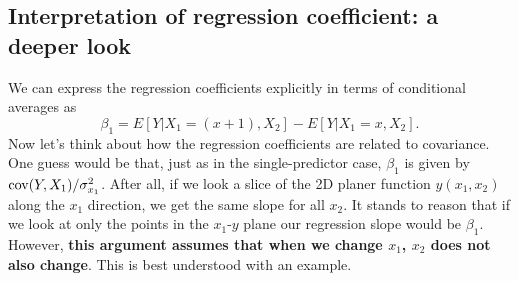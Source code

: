 \subsection{Interpretation of regression coefficient: a deeper look}
 We can express the regression coefficients explicitly in terms of conditional averages as
 \begin{equation}\label{eq:beta1exp}
 \beta_1 = E[Y|X_1 = (x+1),X_2] -  E[Y|X_1 = x,X_2].
 \end{equation}
Now let's think about how the regression coefficients are related to covariance. One guess would be that, just as in the single-predictor case, $\beta_1$ is given by ${\rm cov}(Y,X_1)/\sigma_{x_1}^2$. After all, if we look a slice of the 2D planer function $y(x_1,x_2)$ along the $x_1$ direction, we get the same slope for all $x_2$.  It stands to reason that if we look at only the points in the $x_1$-$y$ plane our regression slope would be $\beta_1$. However, {\bf this argument assumes that when we change $x_1$, $x_2$ does not also change}. This is best understood with an example. 


